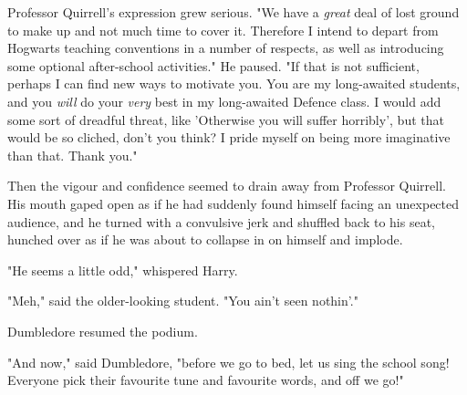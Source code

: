 Professor Quirrell's expression grew serious. "We have a \emph{great} deal of 
lost ground to make up and not much time to cover it. Therefore I intend to 
depart from Hogwarts teaching conventions in a number of respects, as well as 
introducing some optional after-school activities." He paused. "If that is not 
sufficient, perhaps I can find new ways to motivate you. You are my 
long-awaited students, and you \emph{will} do your \emph{very} best in my 
long-awaited Defence class. I would add some sort of dreadful threat, like 
'Otherwise you will suffer horribly', but that would be so cliched, don't you 
think? I pride myself on being more imaginative than that. Thank you."

Then the vigour and confidence seemed to drain away from Professor Quirrell. 
His mouth gaped open as if he had suddenly found himself facing an unexpected 
audience, and he turned with a convulsive jerk and shuffled back to his seat, 
hunched over as if he was about to collapse in on himself and implode.

"He seems a little odd," whispered Harry.

"Meh," said the older-looking student. "You ain't seen nothin'."

Dumbledore resumed the podium.

"And now," said Dumbledore, "before we go to bed, let us sing the school song! 
Everyone pick their favourite tune and favourite words, and off we go!"
